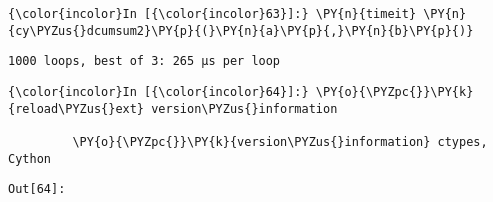     \begin{Verbatim}[commandchars=\\\{\}]
{\color{incolor}In [{\color{incolor}63}]:} \PY{n}{timeit} \PY{n}{cy\PYZus{}dcumsum2}\PY{p}{(}\PY{n}{a}\PY{p}{,}\PY{n}{b}\PY{p}{)}
\end{Verbatim}

    \begin{Verbatim}[commandchars=\\\{\}]
1000 loops, best of 3: 265 µs per loop

    \end{Verbatim}







    \begin{Verbatim}[commandchars=\\\{\}]
{\color{incolor}In [{\color{incolor}64}]:} \PY{o}{\PYZpc{}}\PY{k}{reload\PYZus{}ext} version\PYZus{}information
         
         \PY{o}{\PYZpc{}}\PY{k}{version\PYZus{}information} ctypes, Cython
\end{Verbatim}
\texttt{\color{outcolor}Out[{\color{outcolor}64}]:}
